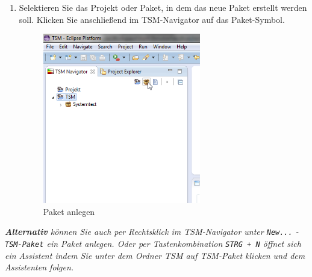 \documentclass[11pt,a4paper,titlepage]{article}
\begin{document}
\begin{enumerate}
\item Selektieren Sie das Projekt oder Paket, in dem das neue Paket erstellt werden soll. Klicken Sie anschließend im TSM-Navigator auf das Paket-Symbol.

\begin{figure}[H]
\centering
\includegraphics[width= 260px]{BilderHandbuchTSMNavigator/Paket/Paket.png}
\caption{Paket anlegen}
\label{fig:Paket}
\end{figure}
\end{enumerate}

\textit{\textbf{Alternativ} können Sie auch per Rechtsklick im TSM-Navigator unter \texttt{New...} - \texttt{TSM-Paket} ein Paket anlegen.
Oder per Tastenkombination \texttt{STRG + N} öffnet sich ein Assistent indem Sie unter dem Ordner TSM auf TSM-Paket klicken und dem Assistenten folgen.}
\end{document}
